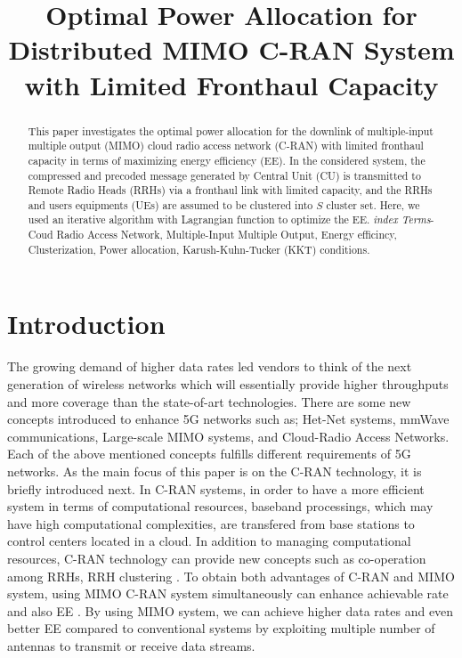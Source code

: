 \documentclass[conference,10pt,twocolumn,letter]{IEEEtran}
\begin{document}
\title{Optimal Power Allocation for Distributed MIMO C-RAN System with Limited Fronthaul Capacity} \author{
    \vspace{-.75cm}
    }
\maketitle
\begin{abstract}
This paper investigates the optimal power allocation for the downlink of multiple-input multiple output (MIMO) cloud radio access network (C-RAN) with limited fronthaul capacity in terms of maximizing energy efficiency (EE). 
In the considered system, the compressed and precoded message generated by Central Unit (CU) is transmitted to Remote Radio Heads (RRHs) via a fronthaul link with limited capacity, and the RRHs and users equipments (UEs) are assumed to be clustered into $S$ cluster set.
Here, we used an iterative algorithm with Lagrangian function to optimize the EE.
 \emph{index Terms}- Coud Radio Access Network, Multiple-Input Multiple Output, Energy efficincy, Clusterization, Power allocation, Karush-Kuhn-Tucker (KKT) conditions.
\end{abstract}
\IEEEpeerreviewmaketitle
\section{Introduction}
The growing demand of higher data rates led vendors to think of the next generation of wireless networks which will essentially provide higher throughputs and more coverage than the state-of-art technologies. There are some new concepts introduced to enhance 5G networks such as; Het-Net systems, mmWave communications, Large-scale MIMO systems, and Cloud-Radio Access Networks. Each of the above mentioned concepts fulfills different requirements of 5G networks. As the main focus of this paper is on the C-RAN technology, it is briefly introduced next. In C-RAN systems, in order to have a more efficient system in terms of computational resources, baseband processings, which may have high computational complexities, are transfered from base stations to control centers located in a cloud. In addition to managing computational resources, C-RAN technology can provide new concepts such as co-operation among RRHs, RRH clustering \cite{33,55}. To obtain both advantages of C-RAN and MIMO system, using MIMO C-RAN system simultaneously can enhance achievable rate and also EE \cite{33}. By using MIMO system, we can achieve higher data rates and even better EE compared to conventional systems by exploiting multiple number of antennas to transmit or receive data streams.
\end{document}
